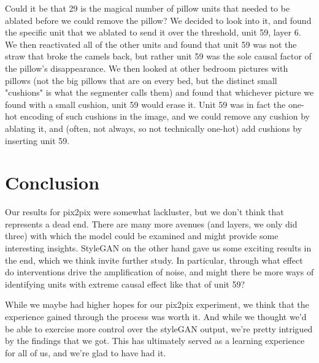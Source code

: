 \documentclass{article}
\begin{document}
Could it be that 29 is the magical number of pillow units that needed to be ablated before we could remove the pillow? We decided to look into it, and found the specific unit that we ablated to send it over the threshold, unit 59, layer 6. We then reactivated all of the other units and found that unit 59 was not the straw that broke the camels back, but rather unit 59 was the sole causal factor of the pillow's disappearance. We then looked at other bedroom pictures with pillows (not the big pillows that are on every bed, but the distinct small "cushions" is what the segmenter calls them) and found that whichever picture we found with a small cushion, unit 59 would erase it. Unit 59 was in fact the one-hot encoding of such cushions in the image, and we could remove any cushion by ablating it, and (often, not always, so not technically one-hot) add cushions by inserting unit 59. 

\section{Conclusion}
Our results for pix2pix were somewhat lackluster, but we don't think that represents a dead end. There are many more avenues (and layers, we only did three) with which the model could be examined and might provide some interesting insights. StyleGAN on the other hand gave us some exciting results in the end, which we think invite further study. In particular, through what effect do interventions drive the amplification of noise, and might there be more ways of identifying units with extreme causal effect like that of unit 59? 

While we maybe had higher hopes for our pix2pix experiment, we think that the experience gained through the process was worth it. And while we thought we'd be able to exercise more control over the styleGAN output, we're pretty intrigued by the findings that we got. This has ultimately served as a learning experience for all of us, and we're glad to have had it.


\end{document}
